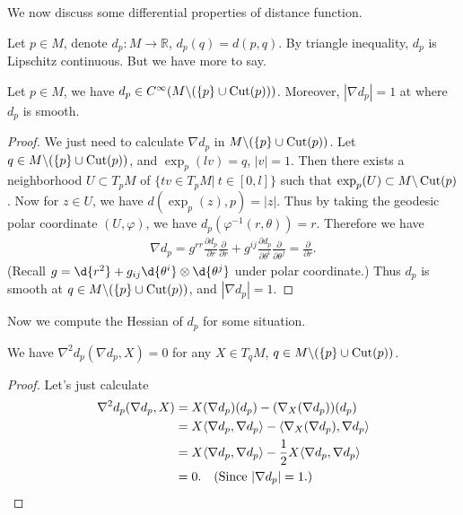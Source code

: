 We now discuss some differential properties of distance function.

Let $p\in M$, denote $d_p:M\to\mathbb{R}$, $d_p(q)=d(p,q)$.
By triangle inequality, $d_p$ is Lipschitz continuous.
But we have more to say.
\begin{prop}\label{dp smooth}
    Let $p\in M$, we have $d_p\in C^\infty(M\backslash(\{p\}\cup\operatorname{Cut}(p)))$.
    Moreover, $|\nabla d_p|=1$ at where $d_p$ is smooth.
\end{prop}
\begin{proof}
    We just need to calculate $\nabla d_p$ in $M\backslash(\{p\}\cup\operatorname{Cut}(p))$.
    Let $q\in M\backslash(\{p\}\cup\operatorname{Cut}(p))$, and $\exp_p(lv)=q$, $|v|=1$.
    Then there exists a neighborhood $U\subset T_pM$ of $\{tv\in T_pM|\ t\in[0,l]\}$ such that $\exp_p(U)\subset M\backslash\operatorname{Cut}(p)$.
    Now for $z\in U$, we have $d(\exp_p(z),p)=|z|$.
    Thus by taking the geodesic polar coordinate $(U,\varphi)$, we have $d_p(\varphi^{-1}(r,\theta))=r$.
    Therefore we have
    \begin{align*}
        \nabla d_p=g^{rr}\frac{\partial{d_p}}{\partial{r}}\frac{\partial{}}{\partial{r}}+g^{ij}\frac{\partial{d_p}}{\partial{\theta^i}}\frac{\partial{}}{\partial{\theta^j}}=\frac{\partial{}}{\partial{r}}.
    \end{align*}
    (Recall $g=\d{r^2}+g_{ij}\d{\theta^i}\otimes\d{\theta^j}$ under polar coordinate.)
    Thus $d_p$ is smooth at $q\in M\backslash(\{p\}\cup\operatorname{Cut}(p))$, and $|\nabla d_p|=1$.
\end{proof}

Now we compute the Hessian of $d_p$ for some situation.

\begin{prop}\label{hess dp in tangential}
    We have $\nabla^2d_p(\nabla d_p,X)=0$ for any $X\in T_qM$, $q\in M\backslash(\{p\}\cup\operatorname{Cut}(p))$.
\end{prop}
\begin{proof}
    Let's just calculate
    \begin{align*}
        \nabla^2d_p(\nabla d_p,X)&=X(\nabla d_p)(d_p)-(\nabla_X(\nabla d_p))(d_p)\\
        &=X\langle\nabla d_p,\nabla d_p\rangle-\langle\nabla_X(\nabla d_p),\nabla d_p\rangle\\
        &=X\langle\nabla d_p,\nabla d_p\rangle-\frac{1}{2}X\langle\nabla d_p,\nabla d_p\rangle\\
        &=0.\quad\text{(Since $|\nabla d_p|=1$.)}\qedhere
    \end{align*}
\end{proof}

